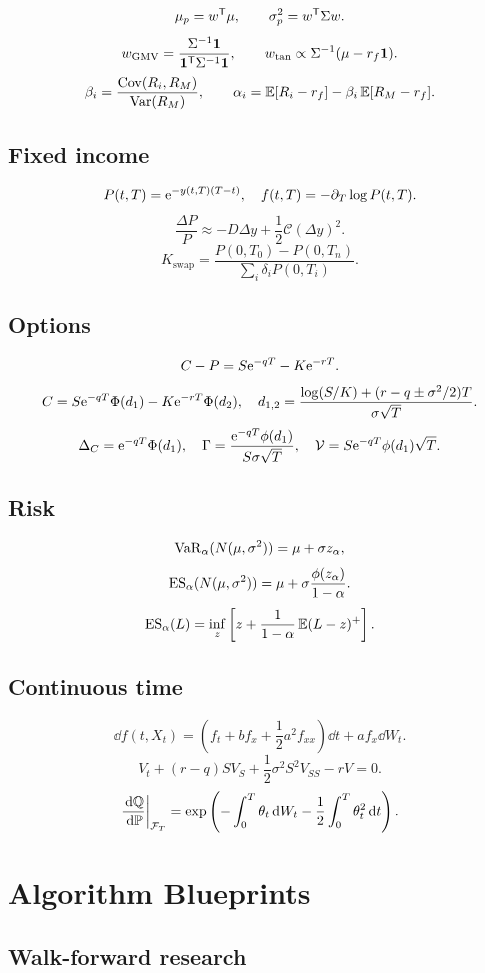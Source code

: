 \[
\mu_p=w^\mathsf T\mu,\qquad
\sigma_p^2=w^\mathsf T\Sigma w.
\]
\[
w_{\mathrm{GMV}}=
\frac{\Sigma^{-1}\bm 1}{\bm 1^\mathsf T\Sigma^{-1}\bm 1},
\qquad
w_{\mathrm{tan}}\propto\Sigma^{-1}(\mu-r_f\bm 1).
\]
\[
\beta_i=\frac{\operatorname{Cov}(R_i,R_M)}{\operatorname{Var}(R_M)},\qquad
\alpha_i=\operatorname{\mathbb E}[R_i-r_f]-\beta_i\operatorname{\mathbb E}[R_M-r_f].
\]

\section{Fixed income}

\[
P(t,T)=\mathrm e^{-y(t,T)(T-t)},\quad
f(t,T)=-\partial_T\log P(t,T).
\]
\[
\frac{\Delta P}{P}\approx-D\Delta y+\frac12\mathcal C(\Delta y)^2.
\]
\[
K_{\mathrm{swap}}=
\frac{P(0,T_0)-P(0,T_n)}
{\sum_i\delta_iP(0,T_i)}.
\]

\section{Options}

\[
C-P=S\mathrm e^{-qT}-K\mathrm e^{-rT}.
\]
\[
C=S\mathrm e^{-qT}\Phi(d_1)-K\mathrm e^{-rT}\Phi(d_2),\quad
d_{1,2}=
\frac{\log(S/K)+(r-q\pm\sigma^2/2)T}{\sigma\sqrt T}.
\]
\[
\Delta_C=\mathrm e^{-qT}\Phi(d_1),\quad
\Gamma=\frac{\mathrm e^{-qT}\phi(d_1)}{S\sigma\sqrt T},\quad
\mathcal V=S\mathrm e^{-qT}\phi(d_1)\sqrt T.
\]

\section{Risk}

\[
\operatorname{VaR}_\alpha(N(\mu,\sigma^2))=\mu+\sigma z_\alpha,
\]
\[
\operatorname{ES}_\alpha(N(\mu,\sigma^2))
=\mu+\sigma\frac{\phi(z_\alpha)}{1-\alpha}.
\]
\[
\operatorname{ES}_\alpha(L)=
\inf_z\left[
z+\frac{1}{1-\alpha}\operatorname{\mathbb E}(L-z)^+
\right].
\]

\section{Continuous time}

\[
\dd f(t,X_t)=
\left(f_t+b f_x+\frac12a^2f_{xx}\right)\dd t
+af_x\dd W_t.
\]
\[
V_t+(r-q)SV_S+\frac12\sigma^2S^2V_{SS}-rV=0.
\]
\[
\frac{\,\mathrm d\mathbb Q}{\,\mathrm d\mathbb P}\bigg|_{\mathcal F_T}
=\exp\left(-\int_0^T\theta_t\,\mathrm d W_t
-\frac12\int_0^T\theta_t^2\,\mathrm d t\right).
\]


\chapter{Algorithm Blueprints}

\section{Walk-forward research}

